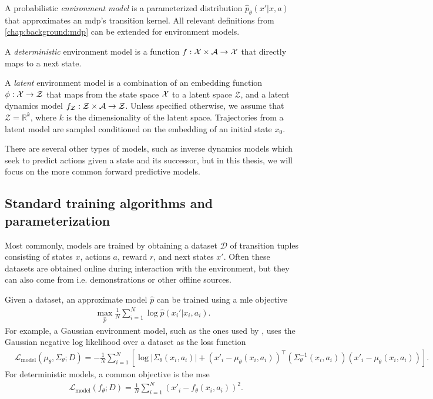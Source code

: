 \begin{definition}
    A probabilistic \emph{environment model} is a parameterized distribution $\hat{p}_\theta(x'|x,a)$ that approximates an \ac{mdp}'s transition kernel.
    All relevant definitions from \autoref{chap:background:mdp} can be extended for environment models.
    
    A \emph{deterministic} environment model is a function $f: \mathcal{X} \times \mathcal{A} \rightarrow \mathcal{X}$ that directly maps to a next state.

    A \emph{latent} environment model is a combination of an embedding function $\phi: \mathcal{X} \rightarrow \mathcal{Z}$ that maps from the state space $\mathcal{X}$ to a latent space $\mathcal{Z}$, and a latent dynamics model $f_\mathcal{Z}: \mathcal{Z} \times \mathcal{A} \rightarrow \mathcal{Z}$.
    Unless specified otherwise, we assume that $\mathcal{Z} = \mathbb{R}^k$, where $k$ is the dimensionality of the latent space.
    Trajectories from a latent model are sampled conditioned on the embedding of an initial state $x_0$.
\end{definition}


There are several other types of models, such as inverse dynamics models which seek to predict actions given a state and its successor, but in this thesis, we will focus on the more common forward predictive models.

\subsection{Standard training algorithms and parameterization}

Most commonly, models are trained by obtaining a dataset $\mathcal{D}$ of transition tuples consisting of states $x$, actions $a$, reward $r$, and next states $x'$. 
Often these datasets are obtained online during interaction with the environment, but they can also come from i.e. demonstrations or other offline sources.

Given a dataset, an approximate model $\hat{p}$ can be trained using a \ac{mle} objective 
\begin{align}
\max_{\hat{p}} \frac{1}{N}\sum_{i=1}^N \log \hat{p}(x_i'|x_i,a_i).
\end{align}
For example, a Gaussian environment model, such as the ones used by \textcite{pets,mbpo,voelcker2022value}, uses the Gaussian negative log likelihood over a dataset as the loss function
\begin{align}
    &\mathcal{L}_\mathrm{model}(\mu_\theta, \Sigma_\theta; D) = - \frac{1}{N} \sum_{i=1}^N \left[\log |\Sigma_\theta(x_i, a_i)| + (x'_i - \mu_\theta(x_i, a_i))^\top \left(\Sigma^{-1}_\theta(x_i, a_i) \right) (x'_i - \mu_\theta(x_i, a_i)) \right].
\end{align}
For deterministic models, a common objective is the \ac{mse}
\begin{align}
    &\mathcal{L}_\mathrm{model}(f_\theta; D) = \frac{1}{N} \sum_{i=1}^N (x'_i - f_\theta(x_i, a_i))^2.
\end{align}

